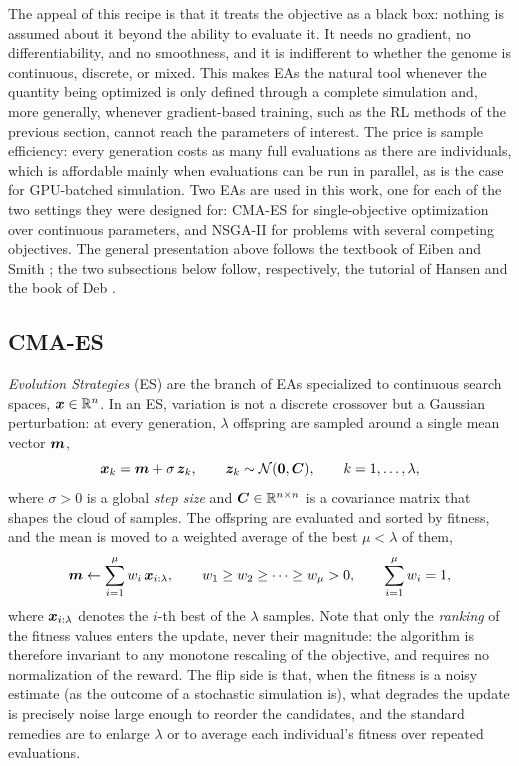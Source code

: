 The appeal of this recipe is that it treats the objective as a black box: nothing is assumed about it beyond the ability to evaluate it. It needs no gradient, no differentiability, and no smoothness, and it is indifferent to whether the genome is continuous, discrete, or mixed. This makes EAs the natural tool whenever the quantity being optimized is only defined through a complete simulation and, more generally, whenever gradient-based training, such as the RL methods of the previous section, cannot reach the parameters of interest. The price is sample efficiency: every generation costs as many full evaluations as there are individuals, which is affordable mainly when evaluations can be run in parallel, as is the case for GPU-batched simulation. Two EAs are used in this work, one for each of the two settings they were designed for: CMA-ES for single-objective optimization over continuous parameters, and NSGA-II for problems with several competing objectives. The general presentation above follows the textbook of Eiben and Smith \cite{eiben2015introduction}; the two subsections below follow, respectively, the tutorial of Hansen \cite{hansen2016tutorial} and the book of Deb \cite{deb2001multi}.

\subsection{CMA-ES}
\label{subsec:cmaes}

\emph{Evolution Strategies} (ES) \cite{rechenberg1973evolutionsstrategie, beyer2002evolution} are the branch of EAs specialized to continuous search spaces, $\bm{x} \in \mathbb{R}^n$. In an ES, variation is not a discrete crossover but a Gaussian perturbation: at every generation, $\lambda$ offspring are sampled around a single mean vector $\bm{m}$,
\begin{equation}
\bm{x}_k = \bm{m} + \sigma\, \bm{z}_k, \qquad \bm{z}_k \sim \mathcal{N}(\bm{0}, \bm{C}), \qquad k = 1, \dots, \lambda,
\label{eq:es-sampling}
\end{equation}
where $\sigma > 0$ is a global \emph{step size} and $\bm{C} \in \mathbb{R}^{n\times n}$ is a covariance matrix that shapes the cloud of samples. The offspring are evaluated and sorted by fitness, and the mean is moved to a weighted average of the best $\mu < \lambda$ of them,
\begin{equation}
\bm{m} \leftarrow \sum_{i=1}^{\mu} w_i\, \bm{x}_{i:\lambda}, \qquad w_1 \ge w_2 \ge \dots \ge w_\mu > 0, \qquad \sum_{i=1}^{\mu} w_i = 1,
\label{eq:es-mean}
\end{equation}
where $\bm{x}_{i:\lambda}$ denotes the $i$-th best of the $\lambda$ samples. Note that only the \emph{ranking} of the fitness values enters the update, never their magnitude: the algorithm is therefore invariant to any monotone rescaling of the objective, and requires no normalization of the reward. The flip side is that, when the fitness is a noisy estimate (as the outcome of a stochastic simulation is), what degrades the update is precisely noise large enough to reorder the candidates, and the standard remedies are to enlarge $\lambda$ or to average each individual's fitness over repeated evaluations.

